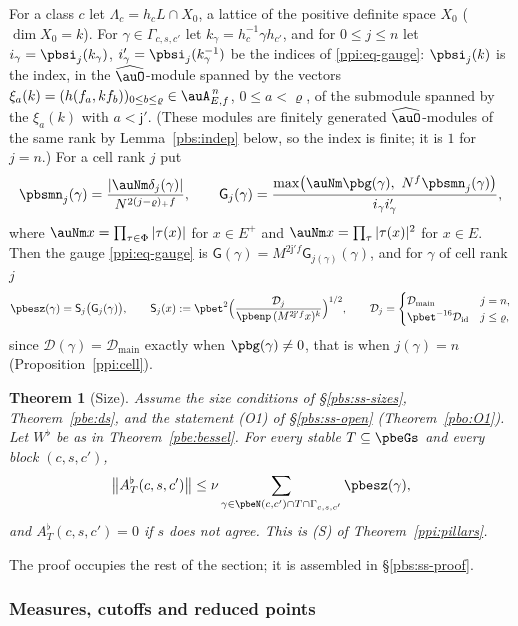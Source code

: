 \documentclass[10pt]{amsart}
\newtheorem{theorem}{Theorem}[section]
\theoremstyle{definition}
\theoremstyle{remark}
\providecommand{\auPl}{\Phi}
\providecommand{\pbDid}{\mathcal D_{\mathrm{id}}}
\providecommand{\pbDmain}{\mathcal D_{\mathrm{main}}}
\begin{document}
For a class $c$ let $\Lambda_c=h_cL\cap X_0$, a lattice of the positive definite space $X_0$
($\dim X_0=k$). For $\gamma\in\Gamma_{c,s,c'}$ let $k_\gamma=h_c^{-1}\gamma h_{c'}$, and for $0\le
j\le n$ let $i_\gamma=\pbsi_j(k_\gamma)$, $i'_\gamma=\pbsi_j(k_\gamma^{-1})$ be the indices of
\eqref{ppi:eq-gauge}: $\pbsi_j(k)$ is the index, in the $\widehat\auO$-module spanned by the
vectors $\xi_a(k)=(h(f_a,kf_b))_{0\le b\le\varrho}\in\auA_{E,f}^{\,n}$, $0\le a<\varrho$, of the
submodule spanned by the $\xi_a(k)$ with $a<\mathsf j'$. (These modules are finitely generated
$\widehat\auO$-modules of the same rank by Lemma~\ref{pbs:indep} below, so the index is finite; it
is $1$ for $j=n$.) For a cell rank $j$ put
\[
\pbsmn_j(\gamma)=\frac{|\auNm\delta_j(\gamma)|}{N^{2(j-\varrho)_+f}},\qquad
\mathsf G_j(\gamma)=\frac{\max\bigl(\auNm\pbg(\gamma),\ N^f\pbsmn_j(\gamma)\bigr)}{i_\gamma
i'_\gamma},
\]
where $\auNm x=\prod_{\tau\in\auPl}|\tau(x)|$ for $x\in E^+$ and $\auNm x=\prod_\tau|\tau(x)|^2$ for
$x\in E$. Then the gauge \eqref{ppi:eq-gauge} is $\mathsf G(\gamma)=M^{2\mathsf j'f}\mathsf
G_{j(\gamma)}(\gamma)$, and for $\gamma$ of cell rank $j$
\[
\pbesz(\gamma)=\mathsf S_j\bigl(\mathsf G_j(\gamma)\bigr),\qquad\mathsf S_j(x):=\pbet^2\Bigl(
\frac{\mathcal D_j}{\pbenp\,(M^{2\mathsf j'f}x)^k}\Bigr)^{1/2},\qquad\mathcal D_j=\begin{cases}
\pbDmain&j=n,\\ \pbet^{-16}\pbDid&j\le\varrho,\end{cases}
\]
since $\mathcal D(\gamma)=\pbDmain$ exactly when $\pbg(\gamma)\ne0$, that is when $j(\gamma)=n$
(Proposition~\ref{ppi:cell}).

\begin{theorem}[Size]\label{pbs:S}
Assume the size conditions of \S\ref{pbs:ss-sizes}, Theorem~\ref{pbe:ds}, and the statement
\textup{(O1)} of \S\ref{pbs:ss-open} (Theorem~\ref{pbo:O1}). Let $W^\flat$ be as in
Theorem~\ref{pbe:bessel}. For every stable $T\subseteq\pbeGs$ and every block $(c,s,c')$,
\[
\bigl\|A^\flat_T(c,s,c')\bigr\|\le\nu\sum_{\gamma\in\pbeN(c,c')\cap T\cap\Gamma_{c,s,c'}}
\pbesz(\gamma),
\]
and $A^\flat_T(c,s,c')=0$ if $s$ does not agree. This is \textup{(S)} of
Theorem~\ref{ppi:pillars}.
\end{theorem}

The proof occupies the rest of the section; it is assembled in \S\ref{pbs:ss-proof}.

\subsubsection{Measures, cutoffs and reduced points}\label{pbs:ss-measures}
\end{document}
